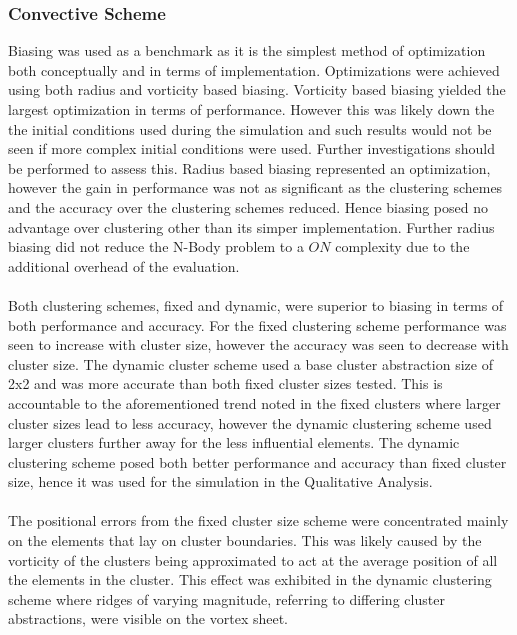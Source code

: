 \subsubsection{Convective Scheme}
Biasing was used as a benchmark as it is the simplest method of optimization both conceptually and in terms of implementation. Optimizations were achieved using both radius and vorticity based biasing. Vorticity based biasing yielded the largest optimization in terms of performance. However this was likely down the the initial conditions used during the simulation and such results would not be seen if more complex initial conditions were used. Further investigations should be performed to assess this. Radius based biasing represented an optimization, however the gain in performance was not as significant as the clustering schemes and the accuracy over the clustering schemes reduced. Hence biasing posed no advantage over clustering other than its simper implementation. Further radius biasing did not reduce the N-Body problem to a $ON$ complexity due to the additional overhead of the evaluation.
\\\\
Both clustering schemes, fixed and dynamic, were superior to biasing in terms of both performance and accuracy. For the fixed clustering scheme performance was seen to increase with cluster size, however the accuracy was seen to decrease with cluster size. The dynamic cluster scheme used a base cluster abstraction size of 2x2 and was more accurate than both fixed cluster sizes tested. This is accountable to the aforementioned trend noted in the fixed clusters where larger cluster sizes lead to less accuracy, however the dynamic clustering scheme used larger clusters further away for the less influential elements. The dynamic clustering scheme posed both better performance and accuracy than fixed cluster size, hence it was used for the simulation in the Qualitative Analysis.
\\\\
The positional errors from the fixed cluster size scheme were concentrated mainly on the elements that lay on cluster boundaries. This was likely caused by the vorticity of the clusters being approximated to act at the average position of all the elements in the cluster. This effect was exhibited in the dynamic clustering scheme where ridges of varying magnitude, referring to differing cluster abstractions, were visible on the vortex sheet.

